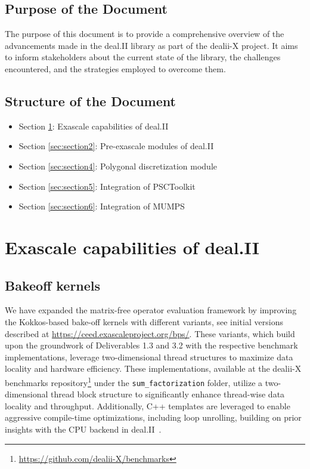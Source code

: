 \documentclass[a4paper,12pt]{article}
\begin{document}
\subsection{{Purpose of the Document}}

The purpose of this document is to provide a comprehensive overview of the advancements made in the deal.II library as part of the dealii-X project. It aims to inform stakeholders about the current state of the library, the challenges encountered, and the strategies employed to overcome them.

\subsection{{Structure of the Document}}
\begin{itemize}
	
    \item Section \ref{sec:section1}: Exascale capabilities of deal.II
	\item Section \ref{sec:section2}: Pre-exascale modules of deal.II
    \item Section \ref{sec:section4}: Polygonal discretization module
    \item Section \ref{sec:section5}: Integration of PSCToolkit
    \item Section \ref{sec:section6}: Integration of MUMPS
\end{itemize}

\newpage

\section{{Exascale capabilities of deal.II}}
\label{sec:section1}



\subsection{{Bakeoff kernels}}


We have expanded the matrix-free operator evaluation framework by improving the Kokkos-based bake-off kernels with different variants, see initial versions described at \url{https://ceed.exascaleproject.org/bps/}.
These variants, which build upon the groundwork of Deliverables 1.3 and 3.2 with the respective benchmark implementations, leverage two-dimensional thread structures to maximize data locality and hardware efficiency. These implementations, available at the dealii-X benchmarks repository\footnote{\url{https://github.com/dealii-X/benchmarks}} under the \texttt{sum\_factorization} folder,
utilize a two-dimensional thread block structure to significantly enhance thread-wise data locality and throughput. Additionally,
C++ templates are leveraged to enable aggressive compile-time optimizations, including loop unrolling, building on prior insights with the CPU backend in deal.II~\citep{KronbichlerKormann}.
\end{document}
